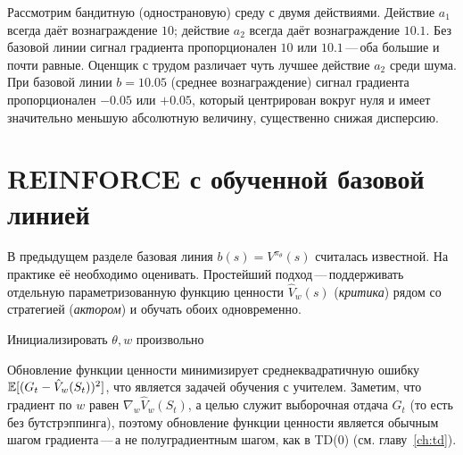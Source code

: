 \begin{example}
\label{ex:baseline-variance}
Рассмотрим бандитную (однострановую) среду с двумя действиями. Действие $a_1$ всегда даёт вознаграждение $10$; действие $a_2$ всегда даёт вознаграждение $10.1$. Без базовой линии сигнал градиента пропорционален $10$ или $10.1$\,---\,оба большие и почти равные. Оценщик с трудом различает чуть лучшее действие $a_2$ среди шума. При базовой линии $b = 10.05$ (среднее вознаграждение) сигнал градиента пропорционален $-0.05$ или $+0.05$, который центрирован вокруг нуля и имеет значительно меньшую абсолютную величину, существенно снижая дисперсию.
\end{example}

\section{REINFORCE с обученной базовой линией}
\label{sec:reinforce-baseline}


В предыдущем разделе базовая линия $b(s) = V^{\pi_\theta}(s)$ считалась известной. На практике её необходимо оценивать. Простейший подход\,---\,поддерживать отдельную параметризованную функцию ценности $\hat V_w(s)$ (\emph{критика}) рядом со стратегией (\emph{актором}) и обучать обоих одновременно.

\begin{algorithm}[ht]
\caption{REINFORCE с обученной базовой линией}
\label{alg:reinforce-baseline}
Инициализировать $\theta, w$ произвольно\;
\end{algorithm}

Обновление функции ценности минимизирует среднеквадратичную ошибку $\operatorname{\mathbb{E}}[(G_t - \hat V_w(S_t))^2]$, что является задачей обучения с учителем. Заметим, что градиент по $w$ равен $\nabla_w \hat V_w(S_t)$, а целью служит выборочная отдача $G_t$ (то есть без бутстрэппинга), поэтому обновление функции ценности является обычным шагом градиента\,---\,а не полуградиентным шагом, как в TD(0) (см. главу~\ref{ch:td}).

